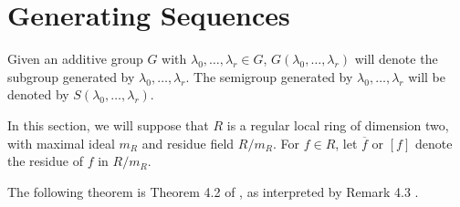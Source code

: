 \documentclass[11pt]{amsart}
\begin{document}
\section{Generating Sequences}\label{SecGen}


Given an additive  group $G$ with $\lambda_0,\ldots, \lambda_r\in G$, $G(\lambda_0,\ldots,\lambda_r)$ will denote the subgroup generated by $\lambda_0,\ldots,\lambda_r$. The semigroup generated by $\lambda_0,\ldots, \lambda_r$ will be denoted by $S(\lambda_0,\ldots,\lambda_r)$. 

In this section, we will suppose that $R$ is a regular local ring of dimension two, with maximal ideal $m_R$ and residue field $R/ m_R$.
For $f\in R$, let $\overline f$ or $[f]$ denote the residue of $f$ in $R/ m_R$. 

The following theorem is Theorem 4.2 of \cite{CV1}, as interpreted by Remark 4.3 \cite{CV1}.
\end{document}
